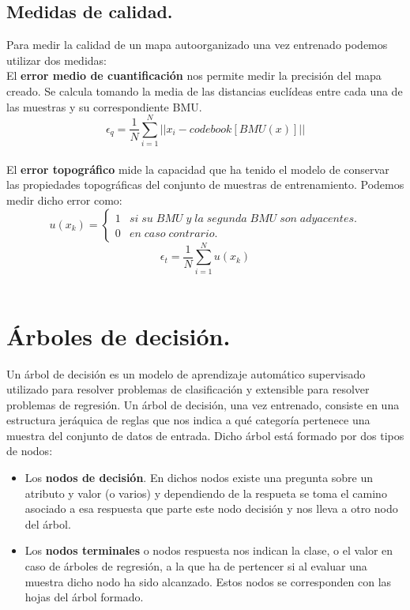 \subsection{Medidas de calidad.}
Para medir la calidad de un mapa autoorganizado una vez entrenado podemos utilizar dos medidas:\\

El \textbf{error medio de cuantificación} nos permite medir la precisión del mapa creado. Se calcula tomando la media de las distancias euclídeas entre cada una de las muestras y su correspondiente BMU.\\

$$
\epsilon_q = \frac{1}{N}\sum_{i=1}^{N}  || x_i - codebook[BMU(x)] ||
$$\\

El \textbf{error topográfico} mide la capacidad que ha tenido el modelo de conservar las propiedades topográficas del conjunto de muestras de entrenamiento. Podemos medir dicho error como:\\
$$
u(x_k) = \left\{
\begin{array}{ll}
1 & si \; su \; BMU \; y \; la \; segunda \; BMU \; son \; adyacentes.\\
0 & en \; caso \; contrario.
\end{array}
\right.
$$
$$
\epsilon_t =  \frac{1}{N}\sum_{i=1}^{N} u(x_k)
$$\\

\newpage
\section{Árboles de decisión.}
Un árbol de decisión \cite{arbol} es un modelo de aprendizaje automático supervisado utilizado para resolver problemas de clasificación y extensible para resolver problemas de regresión. Un árbol de decisión, una vez entrenado, consiste en una estructura jeráquica de reglas que nos indica a qué categoría pertenece una muestra del conjunto de datos de entrada. Dicho árbol está formado por dos tipos de nodos:

\begin{itemize}
	\item Los \textbf{nodos de decisión}. En dichos nodos existe una pregunta sobre un atributo y valor (o varios) y dependiendo de la respueta se toma el camino asociado a esa respuesta que parte este nodo decisión y nos lleva a otro nodo del árbol.
	\item Los \textbf{nodos terminales} o nodos respuesta nos indican la clase, o el valor en caso de árboles de regresión, a la que ha de pertencer si al evaluar una muestra dicho nodo ha sido alcanzado. Estos nodos se corresponden con las hojas del árbol formado.
\end{itemize}


